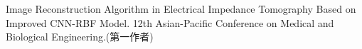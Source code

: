 \begin{achievelist}
 \item Image Reconstruction Algorithm in Electrical Impedance Tomography Based on Improved CNN-RBF Model. 12th Asian-Pacific Conference on Medical and Biological Engineering.(第一作者)
\end{achievelist}

\vspace{\baselineskip}
